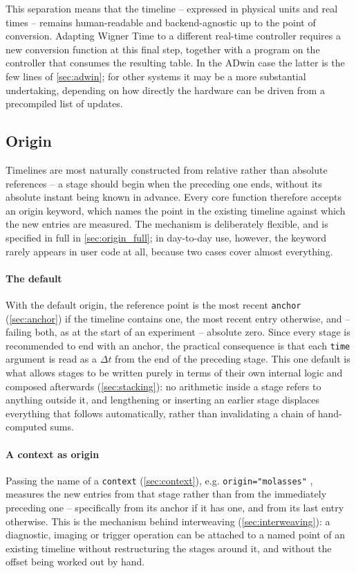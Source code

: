 \documentclass{SciPost}
\newcommand{\python}[1]{%
  \texttt{#1}%
}
\begin{document}
This separation means that the timeline – expressed in physical units and real times – remains human-readable and backend-agnostic up to the point of conversion. Adapting Wigner Time to a different real-time controller requires a new conversion function at this final step, together with a program on the controller that consumes the resulting table. In the ADwin case the latter is the few lines of \cref{sec:adwin}; for other systems it may be a more substantial undertaking, depending on how directly the hardware can be driven from a precompiled list of updates.
 
\subsection{Origin}
\label{sec:origin}
Timelines are most naturally constructed from relative rather than absolute references – a stage should begin when the preceding one ends, without its absolute instant being known in advance. Every core function therefore accepts an origin keyword, which names the point in the existing timeline against which the new entries are measured. The mechanism is deliberately flexible, and is specified in full in \cref{sec:origin_full}; in day-to-day use, however, the keyword rarely appears in user code at all, because two cases cover almost everything.
 
\paragraph{The default} With the default origin, the reference point is the most recent \python{anchor} (\cref{sec:anchor}) if the timeline contains one, the most recent entry otherwise, and – failing both, as at the start of an experiment – absolute zero. Since every stage is recommended to end with an anchor, the practical consequence is that each \python{time} argument is read as a $\Delta t$ from the end of the preceding stage. This one default is what allows stages to be written purely in terms of their own internal logic and composed afterwards (\cref{sec:stacking}): no arithmetic inside a stage refers to anything outside it, and lengthening or inserting an earlier stage displaces everything that follows automatically, rather than invalidating a chain of hand-computed sums.
 
\paragraph{A context as origin} Passing the name of a \python{context} (\cref{sec:context}), e.g. \python{origin="molasses"}, measures the new entries from that stage rather than from the immediately preceding one – specifically from its anchor if it has one, and from its last entry otherwise. This is the mechanism behind interweaving (\cref{sec:interweaving}): a diagnostic, imaging or trigger operation can be attached to a named point of an existing timeline without restructuring the stages around it, and without the offset being worked out by hand.
 
\end{document}
